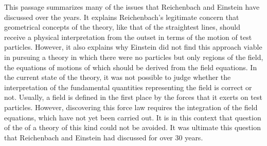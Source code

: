 \documentclass[draft]{article}
\begin{document}
%
This passage summarizes many of the issues that Reichenbach and Einstein have discussed over the years. It explains Reichenbach's legitimate concern that geometrical concepts of the theory, like that of the straightest lines, should receive a physical interpretation from the outset in terms of the motion of test particles. However, it also explains why Einstein did not find this approach viable in pursuing a theory in which there were no particles but only regions of the field, the equations of motions of which should be derived from the field equations. In the current state of the theory, it was not possible to judge whether the interpretation of the fundamental quantities representing the field is correct or not. Usually, a field is defined in the first place by the forces that it exerts on test particles. However, discovering this force law requires the integration of the field equations, which have not yet been carried out. It is in this context that question of the  of a theory of this kind could not be avoided. It was ultimate this question that Reichenbach and Einstein had discussed for over 30 years. 




\printshorthands
\printbibliography
\end{document}
